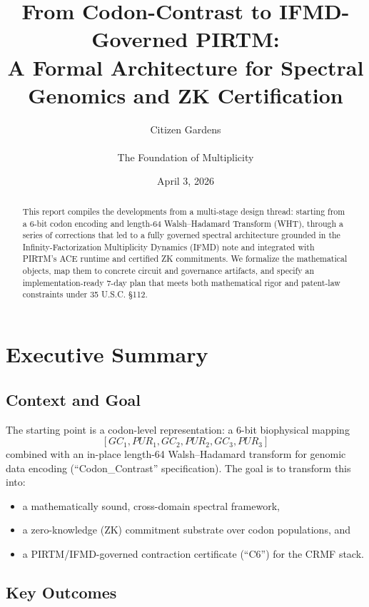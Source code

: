 \documentclass[11pt]{article}
\title{From Codon-Contrast to IFMD-Governed PIRTM:\\
A Formal Architecture for Spectral Genomics and ZK Certification}
\author{Citizen Gardens \\ \\ The Foundation of Multiplicity}
\date{April 3, 2026}
\begin{document}
\maketitle

\begin{abstract}
This report compiles the developments from a multi-stage design thread:
starting from a 6-bit codon encoding and length-64 Walsh--Hadamard Transform (WHT),
through a series of corrections that led to a fully governed spectral
architecture grounded in the Infinity-Factorization Multiplicity Dynamics (IFMD)
note and integrated with PIRTM's ACE runtime and certified ZK commitments.
We formalize the mathematical objects, map them to concrete circuit and
governance artifacts, and specify an implementation-ready 7-day plan that
meets both mathematical rigor and patent-law constraints under 35 U.S.C. \S112.
\end{abstract}
\newpage
\tableofcontents
\newpage
\section{Executive Summary}

\subsection{Context and Goal}
The starting point is a codon-level representation:
a 6-bit biophysical mapping
\[
  [GC_1, PUR_1, GC_2, PUR_2, GC_3, PUR_3]
\]
combined with an in-place length-64 Walsh--Hadamard transform for genomic
data encoding (``Codon\_Contrast'' specification).
The goal is to transform this into:

\begin{itemize}[noitemsep]
  \item a mathematically sound, cross-domain spectral framework,
  \item a zero-knowledge (ZK) commitment substrate over codon populations, and
  \item a PIRTM/IFMD-governed contraction certificate (``C6'') for the CRMF stack.
\end{itemize}

\subsection{Key Outcomes}
\end{document}
